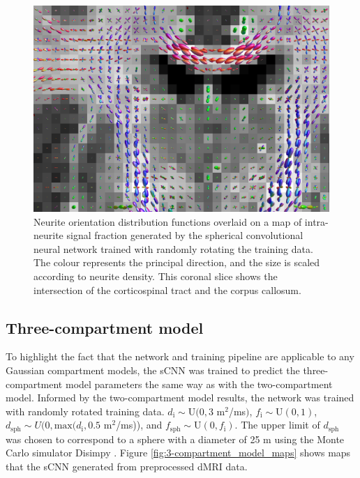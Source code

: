 \documentclass[10pt, letterpaper, oneside]{article}
\begin{document}
\begin{figure}
  \centering
  \includegraphics[width=.99\linewidth]{figures/odfs.png}
  \caption{Neurite orientation distribution functions overlaid on a map of intra-neurite signal fraction generated by the spherical convolutional neural network trained with randomly rotating the training data. The colour represents the principal direction, and the size is scaled according to neurite density. This coronal slice shows the intersection of the corticospinal tract and the corpus callosum.}
  \label{fig:odfs}
\end{figure}

\FloatBarrier

\subsection{Three-compartment model}

To highlight the fact that the network and training pipeline are applicable to any Gaussian compartment models, the sCNN was trained to predict the three-compartment model parameters the same way as with the two-compartment model. Informed by the two-compartment model results, the network was trained with randomly rotated training data. $d_\text{i} \sim \text{U}(0, 3$ \textmu m$^2$/ms$)$, $f_\text{i} \sim \text{U}(0, 1)$, $d_\text{sph} \sim U(0, \text{max}(d_\text{i}, 0.5$ \textmu m$^2$/ms)), and $f_\text{sph} \sim \text{U}(0, f_\text{i})$. The upper limit of $d_\text{sph}$ was chosen to correspond to a sphere with a diameter of 25 \textmu m using the Monte Carlo simulator Disimpy \citep{kerkela2020disimpy}. Figure \ref{fig:3-compartment_model_maps} shows maps that the sCNN generated from preprocessed dMRI data.
\end{document}

